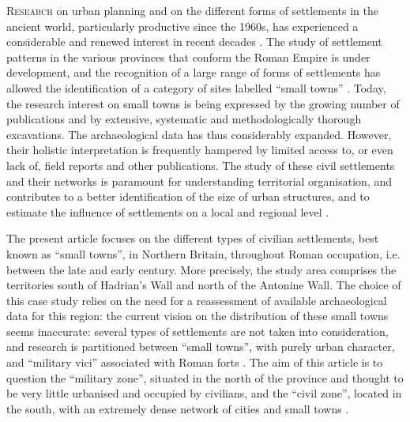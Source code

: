 	
\lettrine[lines=3,slope=4pt,findent=-3pt]{R}{esearch} on urban planning and on the different forms of settlements in the ancient world, particularly productive since the 1960s, has experienced a considerable and renewed interest in recent decades \parencite[227--228]{Petit_1994a}. The study of settlement patterns in the various provinces that conform the Roman Empire is under development, and the recognition of a large range of forms of settlements has allowed the identification of a category of sites labelled “small towns” \parencites[cf.]{Rodwell_1975}{Todd_1970}{Wacher_1995}. Today, the research interest on small towns is being expressed by the growing number of publications \parencites{Blagg_1984}{Favory_2012}{James_2001}{Jones_1991} and by extensive, systematic and methodologically thorough excavations. The archaeological data has thus considerably expanded. However, their holistic interpretation is frequently hampered by limited access to, or even lack of, field reports and other publications. The study of these civil settlements and their networks is paramount for understanding territorial organisation, and contributes to a better identification of the size of urban structures, and to estimate the influence of settlements on a local and regional level \parencite[19]{Mangin_1986}.
	
	The present article focuses on the different types of civilian settlements, best known as “small towns”, in Northern Britain, throughout Roman occupation, i.e. between the late  and early  century\AD. More precisely, the study area comprises the territories south of Hadrian's Wall and north of the Antonine Wall. The choice of this case study relies on the need for a reassessment of available archaeological data for this region: the current vision on the distribution of these small towns seems inaccurate: several types of settlements are not taken into consideration, and research is partitioned between “small towns”, with purely urban character, and “military vici” associated with Roman forts \parencites[e.g.]{Mattingly_2006}{Sommer_1984}{Wacher_1995}. The aim of this article is to question the “military zone”, situated in the north of the province and thought to be very little urbanised and occupied by civilians, and the “civil zone”, located in the south, with an extremely dense network of cities and small towns \parencites[cf.][3--5]{Haverfield_1912} {Jones_1990}. 
	
